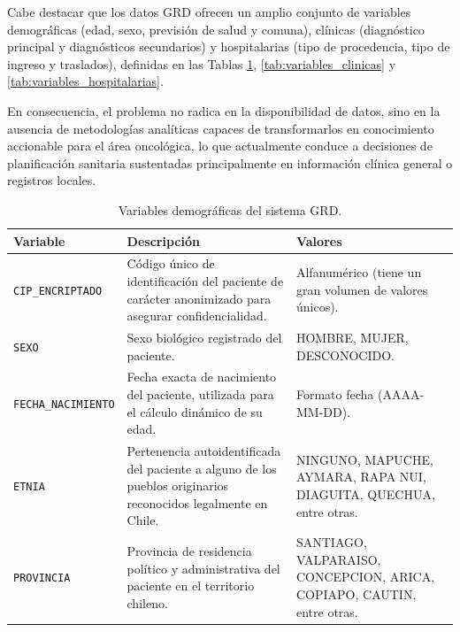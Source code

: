 Cabe destacar que los datos GRD ofrecen un amplio conjunto de variables demográficas (edad, sexo, previsión de salud y comuna), clínicas (diagnóstico principal y diagnósticos secundarios) y hospitalarias (tipo de procedencia, tipo de ingreso y traslados), definidas en las Tablas \ref{tab:variables_demograficas}, \ref{tab:variables_clinicas} y \ref{tab:variables_hospitalarias}.

En consecuencia, el problema no radica en la disponibilidad de datos, sino en la ausencia de metodologías analíticas capaces de transformarlos en conocimiento accionable para el área oncológica, lo que actualmente conduce a decisiones de planificación sanitaria sustentadas principalmente en información clínica general o registros locales.


\begin{table}[htbp]
\centering
\footnotesize
\setlength{\tabcolsep}{4pt}
\renewcommand{\arraystretch}{1.15}
\caption{Variables demográficas del sistema GRD.}
\label{tab:variables_demograficas}
\begin{tabular}{|l|l|l|}
\hline
\parbox[t]{2.55cm}{\textbf{Variable}} & \parbox[t]{6.15cm}{\textbf{Descripción}} & \parbox[t]{4.05cm}{\textbf{Valores}} \\ \hline
\parbox[t]{2.55cm}{\texttt{CIP\_ENCRIPTADO}} & \parbox[t]{6.15cm}{Código único de identificación del paciente de carácter anonimizado para asegurar confidencialidad.} & \parbox[t]{4.05cm}{Alfanumérico (tiene un gran volumen de valores únicos).} \\ \hline
\parbox[t]{2.55cm}{\texttt{SEXO}} & \parbox[t]{6.15cm}{Sexo biológico registrado del paciente.} & \parbox[t]{4.05cm}{HOMBRE, MUJER, DESCONOCIDO.} \\ \hline
\parbox[t]{2.55cm}{\texttt{FECHA\_NACIMIENTO}} & \parbox[t]{6.15cm}{Fecha exacta de nacimiento del paciente, utilizada para el cálculo dinámico de su edad.} & \parbox[t]{4.05cm}{Formato fecha (AAAA-MM-DD).} \\ \hline
\parbox[t]{2.55cm}{\texttt{ETNIA}} & \parbox[t]{6.15cm}{Pertenencia autoidentificada del paciente a alguno de los pueblos originarios reconocidos legalmente en Chile.} & \parbox[t]{4.05cm}{NINGUNO, MAPUCHE, AYMARA, RAPA NUI, DIAGUITA, QUECHUA, entre otras.} \\ \hline
\parbox[t]{2.55cm}{\texttt{PROVINCIA}} & \parbox[t]{6.15cm}{Provincia de residencia político y administrativa del paciente en el territorio chileno.} & \parbox[t]{4.05cm}{SANTIAGO, VALPARAISO, CONCEPCION, ARICA, COPIAPO, CAUTIN, entre otras.} \\ \hline

\end{tabular}
\end{table}

